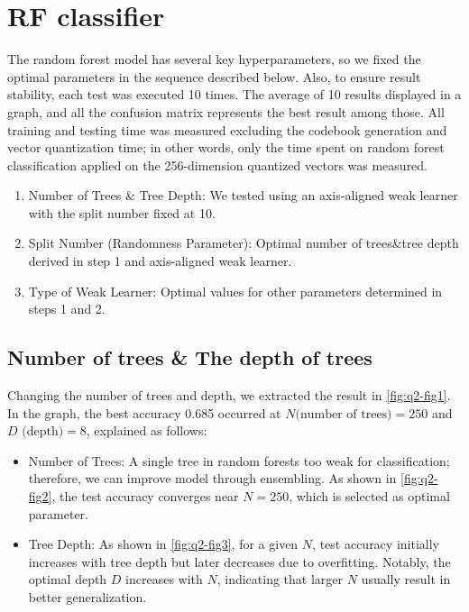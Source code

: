 \section{RF classifier}
\label{sec:intro_q2}

The random forest model has several key hyperparameters, so we fixed the optimal parameters in the sequence described below. Also, to ensure result stability, each test was executed 10 times. The average of 10 results displayed in a graph, and all the confusion matrix represents the best result among those. All training and testing time was measured excluding the codebook generation and vector quantization time; in other words, only the time spent on random forest classification applied on the 256-dimension quantized vectors was measured.
\begin{enumerate}
	\item Number of Trees \& Tree Depth: We tested using an axis-aligned weak learner with the split number fixed at 10.
	\item Split Number (Randomness Parameter): Optimal number of trees\&tree depth derived in step 1 and axis-aligned weak learner.
	\item Type of Weak Learner: Optimal values for other parameters determined in steps 1 and 2.
\end{enumerate}

\subsection{Number of trees \& The depth of trees}
\label{subsec:Q2_1}
Changing the number of trees and depth, we extracted the result in \cref{fig:q2-fig1}. In the graph, the best accuracy 0.685 occurred at $N \text{(number of trees)} = 250$ and $D\text{ (depth)}=8$, explained as follows:
\begin{itemize}
	\item Number of Trees: A single tree in random forests too weak for classification; therefore, we can improve model through ensembling. As shown in \cref{fig:q2-fig2}, the test accuracy converges near $N=250$, which is selected as optimal parameter.
	\item Tree Depth: As shown in \cref{fig:q2-fig3}, for a given $N$, test accuracy initially increases with tree depth but later decreases due to overfitting. Notably, the optimal depth $D$ increases with $N$, indicating that larger $N$ usually result in better generalization.
\end{itemize}

